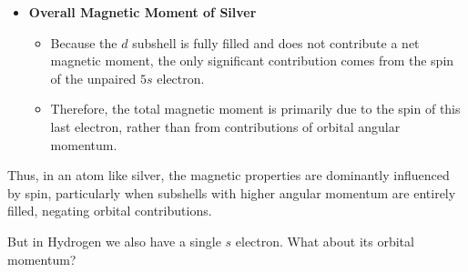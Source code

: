 \begin{airesult}
\begin{itemize}
\item \textbf{Overall Magnetic Moment of Silver}

  \begin{itemize}
  \item Because the \(d\) subshell is fully filled and does not contribute a net magnetic moment,
the only significant contribution comes from the spin of the unpaired \(5s\) electron.
  \item Therefore, the total magnetic moment is primarily due to the spin of this last electron,
rather than from contributions of orbital angular momentum.
  \end{itemize}

\end{itemize}

\vsp

Thus, in an atom like silver, the magnetic properties are dominantly influenced by spin,
particularly when subshells with higher angular momentum are entirely filled, negating orbital
contributions.
\end{airesult}


\begin{ai}
But in Hydrogen we also have a single $s$ electron. What about its orbital momentum?
\end{ai}

